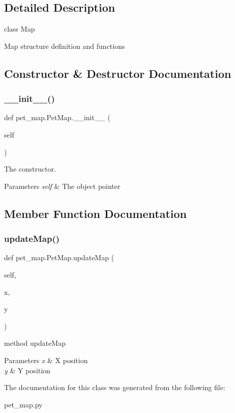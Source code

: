 \subsection{Detailed Description}
class Map 

Map structure definition and functions 

\subsection{Constructor \& Destructor Documentation}
\mbox{\label{classpet__map_1_1PetMap_a8235a0010f925e43233c2133291c5f62}} 
\subsubsection{\texorpdfstring{\+\_\+\+\_\+init\+\_\+\+\_\+()}{\_\_init\_\_()}}
{\footnotesize\ttfamily def pet\+\_\+map.\+Pet\+Map.\+\_\+\+\_\+init\+\_\+\+\_\+ (\begin{DoxyParamCaption}\item[{}]{self }\end{DoxyParamCaption})}



The constructor. 


\begin{DoxyParams}{Parameters}
{\em self} & The object pointer \\
\hline
\end{DoxyParams}


\subsection{Member Function Documentation}
\mbox{\label{classpet__map_1_1PetMap_a98a355ec64fdefbf2ff773d7904995d1}} 
\subsubsection{\texorpdfstring{update\+Map()}{updateMap()}}
{\footnotesize\ttfamily def pet\+\_\+map.\+Pet\+Map.\+update\+Map (\begin{DoxyParamCaption}\item[{}]{self,  }\item[{}]{x,  }\item[{}]{y }\end{DoxyParamCaption})}



method update\+Map 


\begin{DoxyParams}{Parameters}
{\em x} & X position \\
\hline
{\em y} & Y position \\
\hline
\end{DoxyParams}


The documentation for this class was generated from the following file\+:\begin{DoxyCompactItemize}
\item 
pet\+\_\+map.\+py\end{DoxyCompactItemize}
